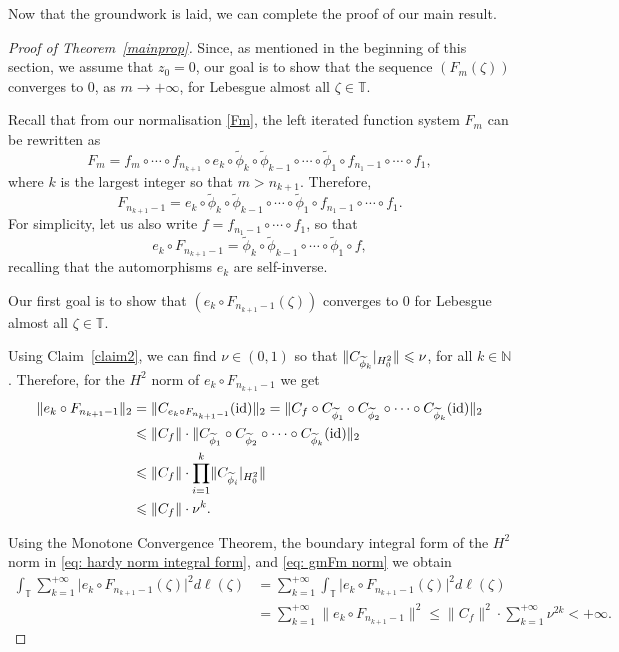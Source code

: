 \documentclass[11pt, reqno]{amsart}
\theoremstyle{definition}
\numberwithin{equation}{section}
\newcommand{\N}{\mathbb{N}}
\newcommand{\T}{\mathbb{T}}
\renewcommand{\leq}{\leqslant}
\begin{document}
Now that the groundwork is laid, we can complete the proof of our main result.

\begin{proof}[Proof of Theorem~\ref{mainprop}]
Since, as mentioned in the beginning of this section, we assume that $z_0=0$, our goal is to show that the sequence $(F_m(\zeta))$ converges to 0, as $m\to+\infty$, for Lebesgue almost all $\zeta\in\T$.

Recall that from our normalisation \eqref{Fm}, the left iterated function system $F_m$ can be rewritten as
\[
F_m= f_m\circ\cdots \circ f_{n_{k+1}}\circ e_k\circ \widetilde{\phi}_k\circ \widetilde{\phi}_{k-1}\circ \cdots\circ \widetilde{\phi}_1\circ f_{n_1-1}\circ\cdots \circ f_1,
\]
where $k$ is the largest integer so that $m>n_{k+1}$. Therefore, 
\[
F_{n_{k+1}-1}= e_k\circ \widetilde{\phi}_k\circ \widetilde{\phi}_{k-1}\circ \cdots\circ \widetilde{\phi}_1\circ f_{n_1-1}\circ\cdots \circ f_1.
\]
For simplicity, let us also write $f=f_{n_1-1}\circ\cdots \circ f_1$, so that
\[
e_k\circ F_{n_{k+1}-1}= \widetilde{\phi}_k\circ \widetilde{\phi}_{k-1}\circ \cdots\circ \widetilde{\phi}_1\circ f,
\]
recalling that the automorphisms $e_k$ are self-inverse. 

Our first goal is to show that $(e_k\circ F_{n_{k+1}-1}(\zeta))$ converges to 0 for Lebesgue almost all $\zeta\in\T$. 

 
Using Claim~\ref{claim2}, we can find $\nu\in(0,1)$ so that $\lVert C_{\widetilde{\phi}_k}\arrowvert_{H_0^2}\rVert\leq \nu$, for all $k\in\N$. Therefore, for the $H^2$ norm of $e_k\circ F_{n_{k+1}-1}$ we get 
\begin{align}
\lVert e_k\circ F_{n_{k+1}-1} \rVert_2 &= \lVert C_{e_k\circ F_{n_{k+1}-1}}(\mathrm{id})\rVert_2 = \lVert C_f\circ C_{\widetilde{\phi}_1}\circ C_{\widetilde{\phi}_2}\circ \cdots \circ C_{\widetilde{\phi}_k}(\mathrm{id})\rVert_2\nonumber\\
	&\leq \lVert C_f \rVert \cdot \lVert C_{\widetilde{\phi}_1}\circ C_{\widetilde{\phi}_2}\circ \cdots \circ C_{\widetilde{\phi}_k}(\mathrm{id})\rVert_2\nonumber\\
	&\leq \lVert C_f \rVert \cdot \prod_{i=1}^{k}\lVert C_{\widetilde{\phi}_i}\arrowvert_{H_0^2}\rVert\nonumber\\
	&\leq\lVert C_f \rVert\cdot \nu^k.\label{eq: gmFm norm}
\end{align}

Using the Monotone Convergence Theorem, the boundary integral form of the $H^2$ norm in \eqref{eq: hardy norm integral form}, and \eqref{eq: gmFm norm} we obtain
\begin{align*}
\int_{\T} \sum_{k=1}^{+\infty} \lvert  e_k\circ F_{n_{k+1}-1}(\zeta)\rvert^2 d\ell(\zeta) &= \sum_{k=1}^{+\infty} \int_{\T} \lvert  e_k\circ F_{n_{k+1}-1}(\zeta)\rvert^2 d\ell(\zeta) \\
&=\sum_{k=1}^{+\infty} \lVert  e_k\circ F_{n_{k+1}-1} \rVert^2 \leq \lVert C_f \rVert^2\cdot \sum_{k=1}^{+\infty} \nu^{2k}<+\infty.
\end{align*}


\end{proof}
\end{document}
